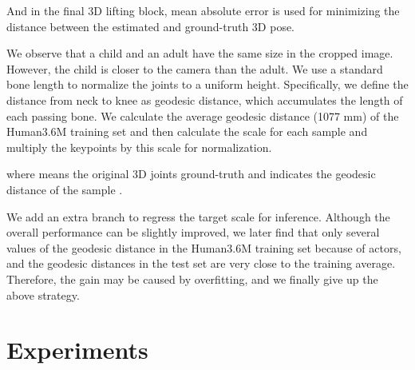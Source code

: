 \documentclass[letterpaper]{article} \usepackage{aaai21}  \usepackage{times}  \usepackage{helvet} \usepackage{courier}  \usepackage[hyphens]{url}  \usepackage{graphicx} \urlstyle{rm} \def\UrlFont{\rm}  \usepackage{natbib}  \usepackage{caption} \frenchspacing  \setlength{\pdfpagewidth}{8.5in}  \setlength{\pdfpageheight}{11in}
\begin{document}
And in the final 3D lifting block, mean absolute error is used for minimizing the distance between the estimated and ground-truth 3D pose.





We observe that a child and an adult have the same size in the cropped image. However, the child is closer to the camera than the adult. We use a standard bone length to normalize the joints to a uniform height. Specifically, we define the distance from neck to knee as geodesic distance, which accumulates the length of each passing bone. We calculate the average geodesic distance (1077 mm) of the Human3.6M training set and then calculate the scale for each sample and multiply the keypoints by this scale for normalization.


where  means the original 3D joints ground-truth and  indicates the geodesic distance of the sample .

We add an extra branch to regress the target scale for inference. Although the overall performance can be slightly improved, we later find that only several values of the geodesic distance in the Human3.6M training set because of actors, and the geodesic distances in the test set are very close to the training average. Therefore, the gain may be caused by overfitting, and we finally give up the above strategy.


\section{Experiments}
\end{document}
